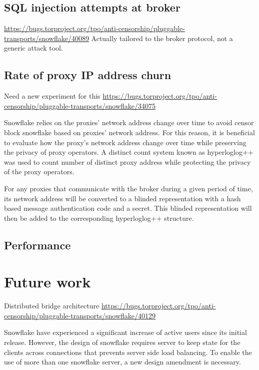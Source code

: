 \documentclass[letterpaper,twocolumn]{article}
\begin{document}
\subsection{SQL injection attempts at broker}


\url{https://bugs.torproject.org/tpo/anti-censorship/pluggable-transports/snowflake/40089}
Actually tailored to the broker protocol, not a generic attack tool.

\subsection{Rate of proxy IP address churn}


Need a new experiment for this
\url{https://bugs.torproject.org/tpo/anti-censorship/pluggable-transports/snowflake/34075}


Snowflake relies on the proxies' network address change over time to avoid censor block snowflake based on proxies' network address. For this reason, it is beneficial to evaluate how the proxy's network address change over time while preserving the privacy of proxy operators. A distinct count system known as hyperloglog++ was used to count number of distinct proxy address while protecting the privacy of the proxy operators.

For any proxies that communicate with the broker during a given period of time, its network address will be converted to a blinded representation with a hash based message authentication code and a secret. This blinded representation will then be added to the corresponding hyperloglog++ structure.

\subsection{Performance}
\label{sec:performance}


\section{Future work}
\label{sec:future}


Distributed bridge architecture
\url{https://bugs.torproject.org/tpo/anti-censorship/pluggable-transports/snowflake/40129}

Snowflake have experienced a significant increase of active users since its initial release. However, the design of snowflake requires server to keep state for the clients across connections that prevents server side load balancing. To enable the use of more than one snowflake server, a new design amendment is necessary.
\end{document}
